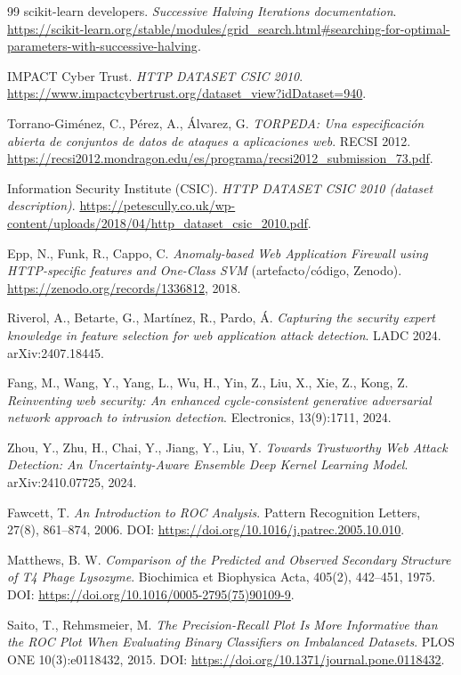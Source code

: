 \documentclass[12pt,oneside]{report}
\begin{document}
\begin{thebibliography}{99}
scikit-learn developers. \emph{Successive Halving Iterations documentation}. \url{https://scikit-learn.org/stable/modules/grid_search.html#searching-for-optimal-parameters-with-successive-halving}.

IMPACT Cyber Trust. \emph{HTTP DATASET CSIC 2010}. \url{https://www.impactcybertrust.org/dataset_view?idDataset=940}.

Torrano-Gim{\'e}nez, C., P{\'e}rez, A., {\'A}lvarez, G.
\emph{TORPEDA: Una especificación abierta de conjuntos de datos de ataques a aplicaciones web}. RECSI 2012.
\url{https://recsi2012.mondragon.edu/es/programa/recsi2012_submission_73.pdf}.

Information Security Institute (CSIC).
\emph{HTTP DATASET CSIC 2010 (dataset description)}.
\url{https://petescully.co.uk/wp-content/uploads/2018/04/http_dataset_csic_2010.pdf}.

Epp, N., Funk, R., Cappo, C.
\emph{Anomaly-based Web Application Firewall using HTTP-specific features and One-Class SVM} (artefacto/código, Zenodo).
\url{https://zenodo.org/records/1336812}, 2018.

Riverol, A., Betarte, G., Martínez, R., Pardo, Á.
\emph{Capturing the security expert knowledge in feature selection for web application attack detection}.
LADC 2024. arXiv:2407.18445.

Fang, M., Wang, Y., Yang, L., Wu, H., Yin, Z., Liu, X., Xie, Z., Kong, Z.
\emph{Reinventing web security: An enhanced cycle-consistent generative adversarial network approach to intrusion detection}.
Electronics, 13(9):1711, 2024.

Zhou, Y., Zhu, H., Chai, Y., Jiang, Y., Liu, Y.
\emph{Towards Trustworthy Web Attack Detection: An Uncertainty-Aware Ensemble Deep Kernel Learning Model}.
arXiv:2410.07725, 2024.

Fawcett, T.
\emph{An Introduction to ROC Analysis}.
Pattern Recognition Letters, 27(8), 861--874, 2006. DOI: \url{https://doi.org/10.1016/j.patrec.2005.10.010}.

Matthews, B. W.
\emph{Comparison of the Predicted and Observed Secondary Structure of T4 Phage Lysozyme}.
Biochimica et Biophysica Acta, 405(2), 442--451, 1975. DOI: \url{https://doi.org/10.1016/0005-2795(75)90109-9}.

Saito, T., Rehmsmeier, M.
\emph{The Precision-Recall Plot Is More Informative than the ROC Plot When Evaluating Binary Classifiers on Imbalanced Datasets}.
PLOS ONE 10(3):e0118432, 2015. DOI: \url{https://doi.org/10.1371/journal.pone.0118432}.


\end{thebibliography}
\end{document}
